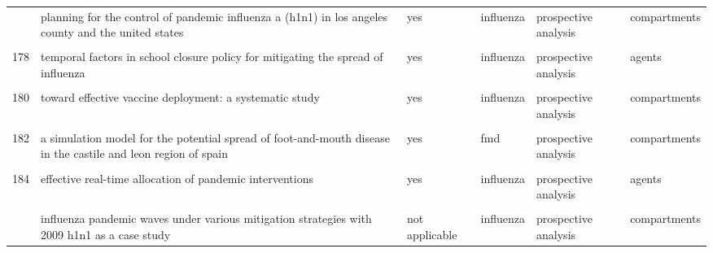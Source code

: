 \documentclass[
]{article}
\begin{document}
\begin{landscape}
\begin{longtable}{l>{\raggedright\arraybackslash}p{3.3cm}l>{\raggedright\arraybackslash}p{3.3cm}>{\raggedright\arraybackslash}p{2cm}l}
\addlinespace
176 & planning for the control of pandemic influenza a (h1n1) in los angeles county and the united states & yes & influenza & prospective analysis & compartments\\
\cellcolor{gray!6}{177} & \cellcolor{gray!6}{prioritization of delayed vaccination for pandemic influenza} & \cellcolor{gray!6}{yes} & \cellcolor{gray!6}{influenza} & \cellcolor{gray!6}{retrospective analysis} & \cellcolor{gray!6}{compartments}\\
178 & temporal factors in school closure policy for mitigating the spread of influenza & yes & influenza & prospective analysis & agents\\
\cellcolor{gray!6}{179} & \cellcolor{gray!6}{the global transmission and control of influenza} & \cellcolor{gray!6}{not applicable} & \cellcolor{gray!6}{influenza} & \cellcolor{gray!6}{prospective analysis} & \cellcolor{gray!6}{compartments}\\
180 & toward effective vaccine deployment: a systematic study & yes & influenza & prospective analysis & compartments\\
\addlinespace
\cellcolor{gray!6}{181} & \cellcolor{gray!6}{vaccination against 2009 pandemic h1n1 in a population dynamical model of vancouver, canada: timing is everything} & \cellcolor{gray!6}{yes} & \cellcolor{gray!6}{influenza} & \cellcolor{gray!6}{prospective analysis} & \cellcolor{gray!6}{compartments}\\
182 & a simulation model for the potential spread of foot-and-mouth disease in the castile and leon region of spain & yes & fmd & prospective analysis & compartments\\
\cellcolor{gray!6}{183} & \cellcolor{gray!6}{community-based measures for mitigating the 2009 h1n1 pandemic in china} & \cellcolor{gray!6}{yes} & \cellcolor{gray!6}{influenza} & \cellcolor{gray!6}{retrospective analysis} & \cellcolor{gray!6}{agents}\\
184 & effective real-time allocation of pandemic interventions & yes & influenza & prospective analysis & agents\\
\cellcolor{gray!6}{185} & \cellcolor{gray!6}{efficient mitigation strategies for epidemics in rural regions} & \cellcolor{gray!6}{yes} & \cellcolor{gray!6}{influenza} & \cellcolor{gray!6}{retrospective analysis} & \cellcolor{gray!6}{compartments}\\
\addlinespace
186 & influenza pandemic waves under various mitigation strategies with 2009 h1n1 as a case study & not applicable & influenza & prospective analysis & compartments\\

\end{longtable}
\end{landscape}
\end{document}
